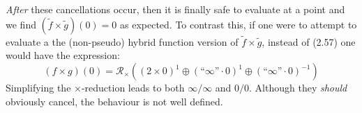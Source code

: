 \emph{After} these cancellations occur, then it is finally safe to evaluate at a point and 
we find $(\tilde{f} \times \tilde{g})(0)=0$ as expected.
To contrast this, if one were to attempt to evaluate a the (non-pseudo) hybrid function version of 
$\tilde{f} \times \tilde{g}$, instead of (2.57) one would have the expression:
\begin{equation}
	(f \times g)(0) = \mathcal{R}_\times \left( (2 \times 0)^1 \oplus (\text{``}\infty\text{''} \cdot 0)^1 \oplus (\text{``}\infty\text{''} \cdot 0)^{-1} \right)
\end{equation}
Simplifying the $\times$-reduction leads to both $\infty / \infty$ and $0/0$.
Although they \emph{should} obviously cancel, the behaviour is not well defined.
